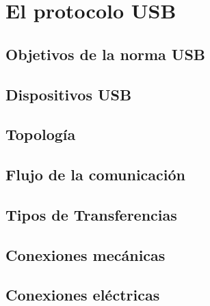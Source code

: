 \chapter{El protocolo USB}
	\label{cap:usb}
	
		\section{Objetivos de la norma USB}	
		\section{Dispositivos USB}
		\section{Topología}
		\section{Flujo de la comunicación}
		\section{Tipos de Transferencias}
		\section{Conexiones mecánicas}
		\section{Conexiones eléctricas}
